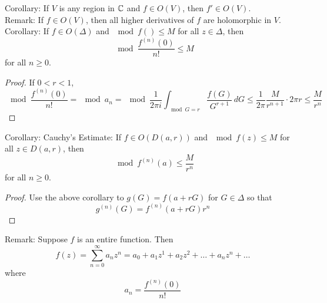 \documentclass[12pt]{article}
\begin{document}
Corollary: If $V$ is any region in $\mathbb{C}$ and $f \in O(V)$, then $f' \in O(V)$. \\
Remark: If $f \in O(V)$, then all higher derivatives of $f$ are holomorphic in $V$. \\
Corollary: If $f \in O(\Delta)$ and $\mod{f()} \leq M$ for all $z \in \Delta$, then $$ \mod{ \frac{f^{(n)}(0)}{n!}} \leq M $$ for all $n \geq 0$. 
\begin{proof} If $0 < r < 1$, $$ \mod{\frac{f^{(n)}(0)}{n!}} = \mod{a_n} = \mod{ \frac{1}{2\pi i} \int_{\mod{G} = r} \frac{f(G)}{G^{r+1}} \, dG} \leq \frac{1}{2\pi} \frac{M}{r^{n+1}} \cdot 2\pi r \leq \frac{M}{r^n} $$ \end{proof} 
Corollary: Cauchy's Estimate: If $f \in O(D(a,r))$ and $\mod{f(z)} \leq M$ for all $z \in D(a,r)$, then $$ \mod{f^{(n)}(a)} \leq \frac{M}{r^n} $$ for all $n\geq0$. 
\begin{proof} Use the above corollary to $g(G) = f(a+rG)$ for $G \in \Delta$ so that $$g^{(n)}(G) = f^{(n)}(a+rG)r^n $$ \end{proof} 
Remark: Suppose $f$ is an entire function. Then $$f(z) = \sum_{n=0}^\infty a_nz^n = a_0 + a_1z^1 + a_2z^2 + \dots + a_nz^n + \dots $$ where $$a_n = \frac{f^{(n)}(0)}{n!} $$ 
\end{document}
